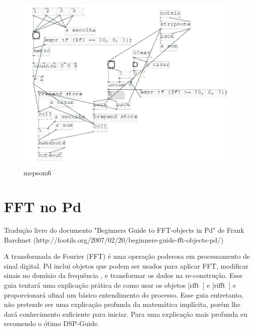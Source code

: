\documentclass{ppgmus}
\begin{document}
\begin{figure}
\includegraphics[scale=.4]{mepsom6}
\caption{mepsom6}
\label{mepsom6}
\end{figure}



\section{FFT no Pd}
\label{sec:fftpd}

Tradução livre do documento "Beginners Guide to FFT-objects in Pd" de Frank Barchnet 
(http://footils.org/2007/02/20/beginners-guide-fft-objects-pd/)

A transformada de Fourier (FFT) é uma operação poderosa em processamento de sinal digital.
Pd inclui objetos que podem ser usados para aplicar FFT, modificar sinais no domínio da frequência , 
e transformar os dados na re-construção. Esse guia tentará uma explicação prática de como usar os 
objetos [rfft~] e [rifft~] e proporcionará afinal um básico entendimento do processo.
Esse guia entretanto, não pretende ser uma explicação profunda da matemática implícita, porém lhe 
dará conhecimento suficiente para iniciar. Para uma explicação mais profunda eu recomendo o ótimo  
DSP-Guide.
\end{document}
